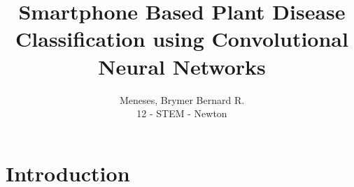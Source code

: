 \documentclass[a4paper, 12pt]{report}
\title{
    Smartphone Based Plant Disease Classification using
    Convolutional Neural Networks
}
\author{
    Meneses, Brymer Bernard R. \\[-4mm]
    {\small 12 - STEM - Newton}
}
\date{}
\begin{document}
 

    \maketitle 


    \chapter{Introduction}
    
    
\end{document}
